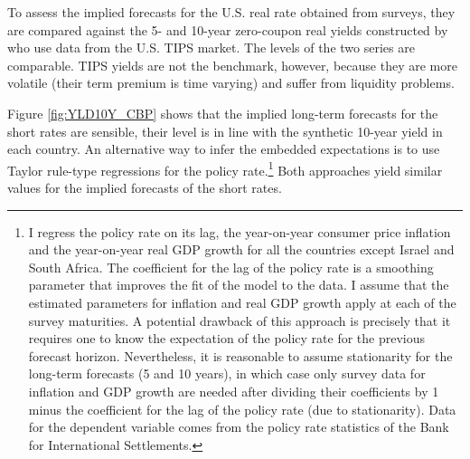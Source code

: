 {To assess the implied forecasts for the U.S. real rate obtained from surveys, they are compared against the 5- and 10-year zero-coupon real yields constructed by \cite{GSW:2010} who use data from the U.S. TIPS market.
The levels of the two series are comparable. 
TIPS yields are not the benchmark, however, because they are more volatile (their term premium is time varying) and suffer from liquidity problems.

Figure \ref{fig:YLD10Y_CBP} shows that the implied long-term forecasts for the short rates are sensible, their level is in line with the synthetic 10-year yield in each country.
An alternative way to infer the embedded expectations is to use Taylor rule-type regressions for the policy rate.\footnote{ I regress the policy rate on its lag, the year-on-year consumer price inflation and the year-on-year real GDP growth for all the countries except Israel and South Africa. The coefficient for the lag of the policy rate is a smoothing parameter that improves the fit of the model to the data. I assume that the estimated parameters for inflation and real GDP growth apply at each of the survey maturities. A potential drawback of this approach is precisely that it requires one to know the expectation of the policy rate for the previous forecast horizon. Nevertheless, it is reasonable to assume stationarity for the long-term forecasts (5 and 10 years), in which case only survey data for inflation and GDP growth are needed after dividing their coefficients by 1 minus the coefficient for the lag of the policy rate (due to stationarity). Data for the dependent variable comes from the policy rate statistics of the Bank for International Settlements.}
Both approaches yield similar values for the implied forecasts of the short rates. %




}
